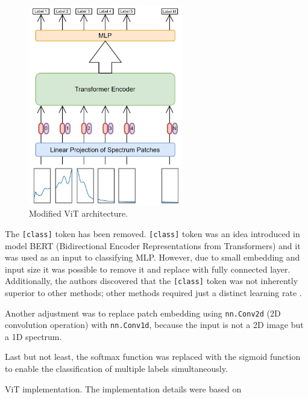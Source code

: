 \begin{figure}[H] 
  \centering     
  \includegraphics[width=0.6\textwidth]{img/vit_changed.png} 
  \caption{Modified ViT architecture.}
  \label{fig:modified-vit-architecture}
\end{figure}

The \texttt{[class]} token has been removed.
\texttt{[class]} token was an idea introduced in model BERT (Bidirectional Encoder Representations from Transformers) \cite{bertOriginal} and it was used as an input to classifying MLP.
However, due to small embedding and input size it was possible to remove it and replace with fully connected layer.
Additionally, the authors discovered that the \texttt{[class]} token was not inherently superior to other methods; other methods required just a distinct learning rate \cite{vitPaper}.

Another adjustment was to replace patch embedding using \texttt{nn.Conv2d} (2D convolution operation) with \texttt{nn.Conv1d}, because the input is not a 2D image but a 1D spectrum. 

Last but not least, the softmax function was replaced with the sigmoid function to enable the classification of multiple labels simultaneously.

\newenvironment{longlistingC}{\captionsetup{type=listing, width=0.8\textwidth}}{}
\begin{longlistingC}
    \caption{ViT implementation. The implementation details were based on \cite{d2lViT}}
    \label{lst:vit}
\end{longlistingC}
\vspace{12pt}

